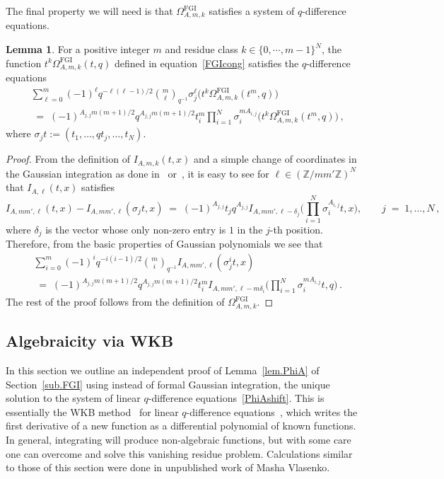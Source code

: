 \documentclass[12pt,reqno]{amsart}
\theoremstyle{definition}
\newtheorem{lemma}[proposition]{Lemma}
\def\BZ{\mathbb Z}
\def\s{\sigma}
\def\be{\begin{equation}}
\def\ee{\end{equation}}
\def\={\;=\;}
\def\FGI{\mathrm{FGI}}
\def\CS{\Omega^{\FGI}}
\begin{document}
The final property we will need is that $\CS_{A,m,k}$ satisfies a system
of $q$-difference equations.

\begin{lemma}
\label{lem.cs.qdiff}
For a positive integer $m$ and residue class $k\in\{0,\cdots,m-1\}^N$, the
function $t^{k}\CS_{A,m,k}(t,q)$ defined in equation~\eqref{FGIcong} satisfies
the $q$-difference equations
\be
\label{PhiFGIAshift}
\begin{aligned}
  &\sum_{\ell=0}^{m}(-1)^{\ell}q^{-\ell(\ell-1)/2}
  \binom{m}{\ell}_{\!\!q^{-1}}\s_j^{\ell}\Big(t^{k}\CS_{A,m,k}(t^{m},q)\Big)\\
  &\=
  (-1)^{A_{j,j}m(m+1)/2}q^{A_{j,j}m(m+1)/2}t_i^{m}
  \prod_{i=1}^N \s_i^{mA_{i,j}}\Big(
  t^{k}\CS_{A,m,k}(t^{m},q)\Big)\,,
\end{aligned}
\ee
where $\s_jt:=(t_1,\dots,qt_j,\dots, t_N)$.
\end{lemma}

\begin{proof}
From the definition of $I_{A,m,k}(t,x)$ and a simple change of coordinates in the
Gaussian integration as done in~\cite{AarhusII} or~\cite{GSW}, it is easy to see for
$\ell\in(\BZ/mm'\BZ)^{N}$ that $I_{A,\ell}(t,x)$ satisfies
\be
\label{SAshift}
I_{A,mm',\ell}(t,x) - I_{A,mm',\ell}(\s_j t,x) \= (-1)^{A_{j,j}} t_{j} q^{A_{j,j}}
I_{A,mm',\ell-\delta_j}\bigg(\prod_{i=1}^N \s_i^{A_{i,j}}t,x\bigg),
\qquad j\=1,\dots,N\,,
\ee
where $\delta_j$ is the vector whose only non-zero entry is $1$ in the $j$-th
position. Therefore, from the basic properties of Gaussian polynomials we see that
\be
\begin{aligned}
&\sum_{i=0}^{m}(-1)^{i}q^{-i(i-1)/2}\binom{m}{i}_{\!\!q^{-1}}I_{A,mm',\ell}(\s_j^{i}t,x)
\\
&\= (-1)^{A_{j,j}m(m+1)/2}q^{A_{j,j}m(m+1)/2}t_i^{m}
I_{A,mm',\ell-m\delta_i}\bigg(\prod_{i=1}^N \s_i^{mA_{i,j}}t,q\bigg)\,.
\end{aligned}
\ee
The rest of the proof follows from the definition of $\CS_{A,m,k}$.
\end{proof}

\subsection{Algebraicity via WKB}
\label{sub.WKB}

In this section we outline an independent proof of Lemma~\ref{lem.PhiA} of
Section~\ref{sub.FGI} using instead of formal Gaussian integration, the unique
solution to the system of
linear $q$-difference equations~\eqref{PhiAshift}. This is essentially the WKB
method~\cite{Bender} for linear $q$-difference equations~\cite{GG:qdiff}, which
writes the first derivative of a new function as a
differential polynomial of known functions. In general, integrating will produce
non-algebraic functions, but with some care one can overcome and solve this
vanishing residue problem. Calculations similar to those of this section were done in
unpublished work of Masha Vlasenko.
\end{document}
